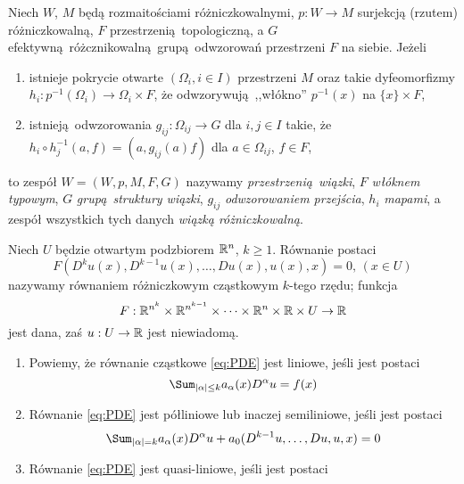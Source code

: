 \begin{definicja}\cite[s. 300]{maurin2}
    Niech \(W\), \(M\) będą rozmaitościami różniczkowalnymi, \(p: W \rightarrow M\) surjekcją
    (rzutem) różniczkowalną, \(F\) przestrzenią topologiczną, a \(G\)
    efektywną różcznikowalną grupą odwzorowań przestrzeni \(F\) na siebie. Jeżeli
    \begin{enumerate}[label=(\alph*)]
        \item istnieje pokrycie otwarte \((\Omega_i, i\in I)\) przestrzeni \(M\) oraz takie
            dyfeomorfizmy \(h_i: p^{-1}(\Omega_i) \rightarrow \Omega_i \times F\), że
            odwzorywują ,,włókno'' \(p^{-1}(x)\) na \(\{x\} \times F\),
        \item istnieją odwzorowania \(g_{ij}: \Omega_{ij} \rightarrow G\) dla \(i, j \in I\) takie,
            że \(h_i \circ h_j^{-1}(a, f) = (a, g_{ij}(a)f)\) dla \(a\in \Omega_{ij}\), \(f \in F\),
    \end{enumerate}
            to zespół \(W = (W, p, M, F, G)\) nazywamy \emph{przestrzenią wiązki}, \(F\)
            \emph{włóknem typowym},
            \(G\) \emph{grupą struktury wiązki}, \(g_{ij}\) \emph{odwzorowaniem przejścia}, \(h_i\)
            \emph{mapami}, a
            zespół wszystkich tych danych \emph{wiązką różniczkowalną}.
\end{definicja}

\begin{definicja}\cite[s. 17]{evans}
    Niech \(U\) będzie otwartym podzbiorem \(\mathbb{R}^n\), \(k \geq 1\).
    Równanie postaci
    \begin{equation} \label{eq:PDE}
        F(D^k u(x), D^{k-1} u(x), \dots, D u(x), u(x), x) = 0, \, (x\in U)
    \end{equation}
    nazywamy równaniem różniczkowym cząstkowym \(k\)-tego rzędu; funkcja
    \begin{equation*}
        F: \mathbb{R}^{n^k} \times \mathbb{R}^{n^{k-1}} \times \dots \times \mathbb{R}^n \times \mathbb{R} \times U \rightarrow \mathbb{R}
    \end{equation*} jest dana, zaś \(u: U \rightarrow \mathbb{R}\) jest niewiadomą.
\end{definicja}

\begin{definicja}\cite[s. 18]{evans}
    \begin{enumerate}[label=(\roman*)]
        \item Powiemy, że równanie cząstkowe \eqref{eq:PDE} jest liniowe, jeśli jest postaci
            \begin{equation*}
                \Sum_{|\alpha|\leq k} a_{\alpha}(x)D^\alpha u = f(x)
            \end{equation*}
        \item  Równanie \eqref{eq:PDE} jest półliniowe lub inaczej semiliniowe, jeśli jest postaci
            \begin{equation*}
                \Sum_{|\alpha|=k} a_\alpha (x) D^\alpha u + a_0 (D^{k-1} u, \dots, Du, u, x) = 0
            \end{equation*}
        \item Równanie \eqref{eq:PDE} jest quasi-liniowe, jeśli jest postaci
            
    \end{enumerate}
\end{definicja}
